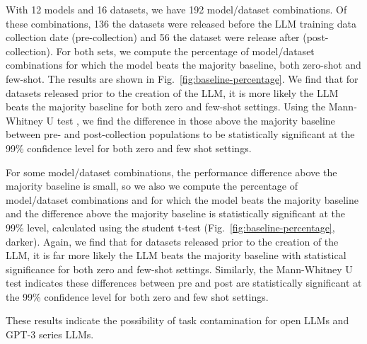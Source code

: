 \documentclass[letterpaper]{article} %
\newcommand{\nilay}[1]{}
\newcommand{\jmfb}[1]{}      %
\begin{document}
With 12 models and 16 datasets, we have 192 model/dataset combinations.  Of these combinations, 136 the datasets were released before the LLM training data collection date (pre-collection) and 56 the dataset were release after (post-collection). For both sets, we compute the percentage of model/dataset combinations for which the model beats the majority baseline, both zero-shot and few-shot. The results are shown in Fig.~\ref{fig:baseline-percentage}. We find that for datasets released prior to the creation of the LLM, it is more likely the LLM beats the majority baseline for both zero and few-shot settings. Using the Mann-Whitney U test \cite{Mann1947}, we find the difference in those above the majority baseline between pre- and post-collection populations to be statistically significant at the 99\% confidence level for both zero and few shot settings. \nilay{This can be clearer. I don't understand exactly what the M-W test showed here. What are the two compared populations? Is this saying "of the models which outperform the majority baseline, the performance on the pre-collection dataset is significantly higher than on the post-collection datasets"? If so, why only consider the cases which outperform the baseline?}

For some model/dataset combinations, the performance difference above the majority baseline is small, so we also we compute the percentage of model/dataset combinations and for which the model beats the majority baseline and the difference above the majority baseline is statistically significant at the 99\% level\nilay{I don't quite understand what this means. How is this different than the previous test?}, calculated using the student t-test \cite{student1908} (Fig.~\ref{fig:baseline-percentage}, darker).  Again, we find that for datasets released prior to the creation of the LLM, it is far more likely the LLM beats the majority baseline with statistical significance for both zero and few-shot settings. Similarly, the Mann-Whitney U test indicates these differences between pre and post are statistically significant at the 99\% confidence level for both zero and few shot settings\nilay{I think the previous few paragraphs can be slightly reworded to better explain exactly what the statistical tests are demonstrating. I'll need a little time to think about how I would word it so I'll come back to this later.}.

These results indicate the possibility of task contamination for open LLMs and GPT-3 series LLMs.

\jmfb{add the caveats to this section (FOMC dataset, and that performance difference doesn't indicate )}
\end{document}
